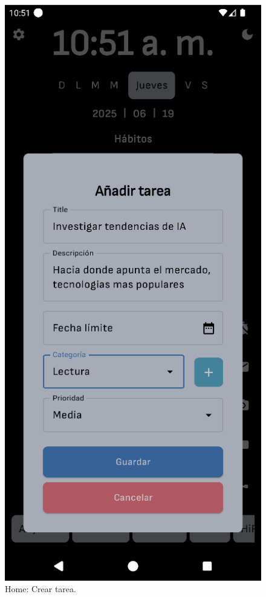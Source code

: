 \begin{figure}[ht]
\begin{minipage}{0.43\textwidth}
  \end{minipage}\hspace{0.05\textwidth}
  \begin{minipage}{0.43\textwidth}
    \caption{Home: Crear tarea.}
    \label{fig:home:crear_tarea}
    \includegraphics[width=\textwidth]{Figuras/secciones/crear_tarea.png}
    \centering
  \end{minipage}
\end{figure}

